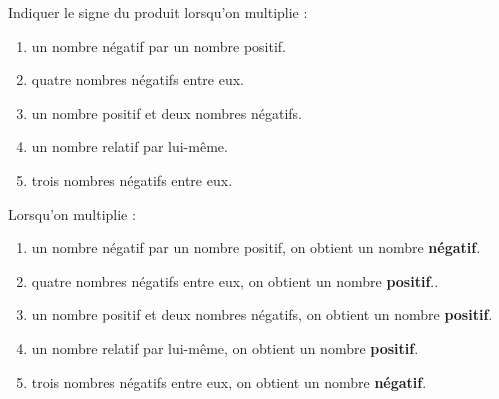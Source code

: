 \begin{exercice*}
    Indiquer le signe du produit lorsqu'on multiplie :
        \begin{enumerate}
            \item un nombre négatif par un nombre positif.
            \item quatre nombres négatifs entre eux.
            \item un nombre positif et deux nombres négatifs.
            \item un nombre relatif par lui-même.
            \item trois nombres négatifs entre eux.
        \end{enumerate}
\end{exercice*}
\begin{corrige}
    \phantom{rrr}    
    Lorsqu'on multiplie : 
        \begin{enumerate}
            \item un nombre négatif par un nombre positif, on obtient un nombre {\bfseries \color[HTML]{f15929}négatif}.
            \item quatre nombres négatifs entre eux, on obtient un nombre {\bfseries \color[HTML]{f15929}positif}..
            \item un nombre positif et deux nombres négatifs, on obtient un nombre {\bfseries \color[HTML]{f15929}positif}.
            \item un nombre relatif par lui-même, on obtient un nombre {\bfseries \color[HTML]{f15929}positif}.
            \item trois nombres négatifs entre eux, on obtient un nombre {\bfseries \color[HTML]{f15929}négatif}.
        \end{enumerate}
\end{corrige}

